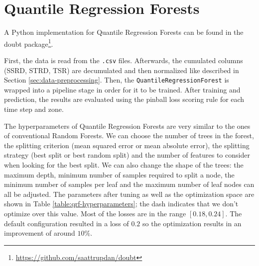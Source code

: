 \section{Quantile Regression Forests}
\label{sec:implementation-qrf}

A Python implementation for Quantile Regression Forests can 
be found in the doubt package\footnote{\url{https://github.com/saattrupdan/doubt}}.

First, the data is read from the \texttt{.csv} files. 
Afterwards, the cumulated columns (SSRD, STRD, TSR) are decumulated and then normalized 
like described in Section \ref{sec:data-preprocessing}.
Then, the \texttt{QuantileRegressionForest} is wrapped into a pipeline stage in order for 
it to be trained.
After training and prediction, the results are evaluated 
using the pinball loss scoring rule for each time step and zone.

The hyperparameters of Quantile Regression Forests are very similar to the ones 
of conventional Random Forests. We can choose the number of trees in the forest, 
the splitting criterion (mean squared error or mean absolute error), 
the splitting strategy (best split or best random split) 
and the number of features to consider when looking for the best split. 
We can also change the shape of the trees: 
the maximum depth, minimum number of samples required to split a node, the minimum number of samples per leaf and 
the maximum number of leaf nodes can all be adjusted.
The parameters after tuning as well as the optimization space 
are shown in Table \ref{table:qrf-hyperparameters}; the dash indicates that we don't optimize over this value.
Most of the losses are in the range \([0.18, 0.24]\). 
The default configuration resulted in a loss of \(0.2\) so 
the optimization results in an improvement of around \(10\%\).

